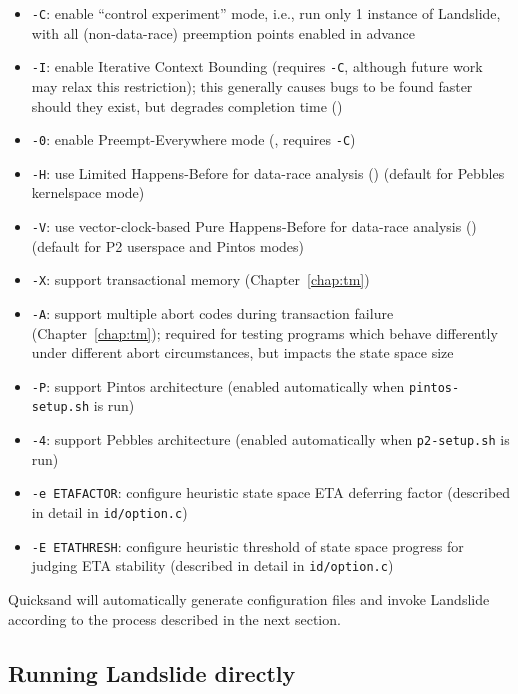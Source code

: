 \begin{itemize}
	\item {\tt -C}: enable ``control experiment'' mode, i.e., run only 1 instance of Landslide, with all (non-data-race) preemption points enabled in advance
	\item {\tt -I}: enable Iterative Context Bounding (requires {\tt -C}, although future work may relax this restriction);
		this generally causes bugs to be found faster should they exist, but degrades completion time
		(\sect{\ref{sec:landslide-icb}})
	\item {\tt -0}: enable Preempt-Everywhere mode (\sect{\ref{sec:quicksand-eval}}, requires {\tt -C})
	\item {\tt -H}: use Limited Happens-Before for data-race analysis (\sect{\ref{sec:background-hb}})
		(default for Pebbles kernelspace mode)
	\item {\tt -V}: use vector-clock-based Pure Happens-Before for data-race analysis (\sect{\ref{sec:background-hb}})
		(default for P2 userspace and Pintos modes)
	\item {\tt -X}: support transactional memory (Chapter~\ref{chap:tm})
	\item {\tt -A}: support multiple abort codes during transaction failure (Chapter~\ref{chap:tm});
		required for testing programs which behave differently under different abort circumstances,
		but impacts the state space size
	\item {\tt -P}: support Pintos architecture (enabled automatically when {\tt pintos-setup.sh} is run)
	\item {\tt -4}: support Pebbles architecture (enabled automatically when {\tt p2-setup.sh} is run)
	\item {\tt -e ETAFACTOR}: configure heuristic state space ETA deferring factor (described in detail in {\tt id/option.c})
	\item {\tt -E ETATHRESH}: configure heuristic threshold of state space progress for judging ETA stability (described in detail in {\tt id/option.c})
\end{itemize}

Quicksand will automatically generate configuration files and invoke Landslide according to the process described in the next section.


\subsection{Running Landslide directly}
\label{sec:landslide-directly}

